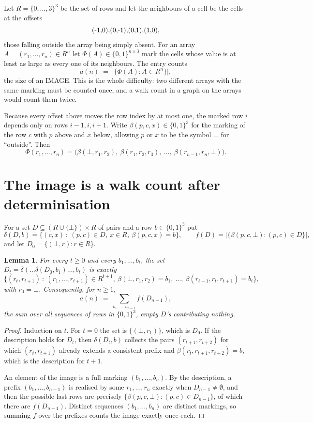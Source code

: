 \documentclass[11pt,a4paper]{article}
\theoremstyle{plain}
\newtheorem{lemma}[theorem]{Lemma}
\theoremstyle{definition}
\begin{document}
Let $R=\{0,\dots,3\}^{3}$ be the set of rows and let the neighbours of a cell be the
cells at the offsets
\[
$(-1,0)$, $(0,-1)$, $(0,1)$, $(1,0)$,
\]
those falling outside the array being simply absent. For an array
$A=(r_1,\dots,r_n)\in R^n$ let $\Phi(A)\in\{0,1\}^{n\times3}$ mark the cells whose value
is at least as large as every one of its neighbours. The entry counts
\[
a(n)\;=\;\bigl|\{\Phi(A):A\in R^n\}\bigr| ,
\]
the size of an IMAGE. This is the whole difficulty: two different arrays with the same marking
must be counted once, and a walk count in a graph on the arrays would count them twice.

Because every offset above moves the row index by at most one, the marked row $i$ depends only
on rows $i-1,i,i+1$. Write $\beta(p,c,x)\in\{0,1\}^{3}$ for the marking of the row $c$
with $p$ above and $x$ below, allowing $p$ or $x$ to be the symbol $\bot$ for ``outside''.
Then
\[
\Phi(r_1,\dots,r_n)=\bigl(\beta(\bot,r_1,r_2),\ \beta(r_1,r_2,r_3),\ \dots,\
\beta(r_{n-1},r_n,\bot)\bigr).
\]

\section{The image is a walk count after determinisation}

For a set $D\subseteq(R\cup\{\bot\})\times R$ of pairs and a row $b\in\{0,1\}^{3}$ put
\[
\delta(D,b)=\{(c,x)\ :\ (p,c)\in D,\ x\in R,\ \beta(p,c,x)=b\},\qquad
f(D)=\bigl|\{\beta(p,c,\bot):(p,c)\in D\}\bigr| ,
\]
and let $D_0=\{(\bot,r):r\in R\}$.

\begin{lemma}\label{lem:det}
For every $t\ge0$ and every $b_1,\dots,b_t$, the set
$D_t=\delta(\dots\delta(D_0,b_1)\dots,b_t)$ is exactly
\[
\{(r_t,r_{t+1})\ :\ (r_1,\dots,r_{t+1})\in R^{t+1},\ \beta(\bot,r_1,r_2)=b_1,\ \dots,\
\beta(r_{t-1},r_t,r_{t+1})=b_t\} ,
\]
with $r_0=\bot$. Consequently, for $n\ge1$,
\[
a(n)\;=\;\sum_{b_1,\dots,b_{n-1}}f(D_{n-1}),
\]
the sum over all sequences of rows in $\{0,1\}^{3}$, empty $D$'s contributing nothing.
\end{lemma}

\begin{proof}
Induction on $t$. For $t=0$ the set is $\{(\bot,r_1)\}$, which is $D_0$. If the description
holds for $D_t$, then $\delta(D_t,b)$ collects the pairs $(r_{t+1},r_{t+2})$ for which
$(r_t,r_{t+1})$ already extends a consistent prefix and
$\beta(r_t,r_{t+1},r_{t+2})=b$, which is the description for $t+1$.

An element of the image is a full marking $(b_1,\dots,b_n)$. By the description, a prefix
$(b_1,\dots,b_{n-1})$ is realised by some $r_1,\dots,r_n$ exactly when $D_{n-1}\neq
\emptyset$, and then the possible last rows are precisely
$\{\beta(p,c,\bot):(p,c)\in D_{n-1}\}$, of which there are $f(D_{n-1})$. Distinct
sequences $(b_1,\dots,b_n)$ are distinct markings, so summing $f$ over the prefixes counts the
image exactly once each.
\end{proof}
\end{document}
